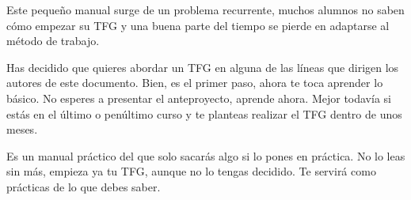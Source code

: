 Este pequeño manual surge de un problema recurrente, muchos alumnos no saben cómo empezar su TFG y una buena parte del tiempo se pierde en adaptarse al método de trabajo.

Has decidido que quieres abordar un TFG en alguna de las líneas que dirigen los autores de este documento.  Bien, es el primer paso, ahora te toca aprender lo básico.  No esperes a presentar el anteproyecto, aprende ahora.  Mejor todavía si estás en el último o penúltimo curso y te planteas realizar el TFG dentro de unos meses.

Es un manual práctico del que solo sacarás algo si lo pones en práctica.  No lo leas sin más, empieza ya tu TFG, aunque no lo tengas decidido. Te servirá como prácticas de lo que debes saber.